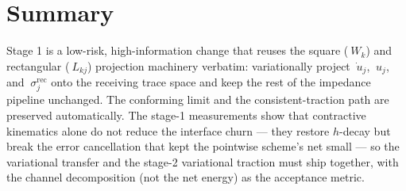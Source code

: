 \documentclass[11pt]{article}
\begin{document}
\section{Summary}

Stage 1 is a low-risk, high-information change that reuses the square
($~W_k$) and rectangular ($~L_{kj}$) projection machinery verbatim:
variationally project $\dot{~u}_j$, $~u_j$, and $~\sigma_j^{\mathrm{rec}}$
onto the receiving trace space and keep the rest of the impedance
pipeline unchanged.  The conforming limit and the consistent-traction
path are preserved automatically.  The stage-1 measurements show that
contractive kinematics alone do not reduce the interface churn ---
they restore $h$-decay but break the error cancellation that kept the
pointwise scheme's net small --- so the variational transfer and the
stage-2 variational traction must ship together, with the channel
decomposition (not the net energy) as the acceptance metric.
\end{document}

